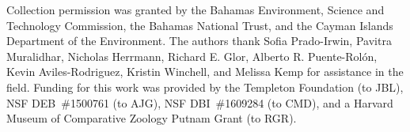 Collection permission was granted by the Bahamas Environment, Science and Technology Commission, the Bahamas National Trust, and the Cayman Islands Department of the Environment. The authors thank Sofia Prado-Irwin, Pavitra Muralidhar, Nicholas Herrmann, Richard E. Glor, Alberto R. Puente-Rol\'{o}n, Kevin Aviles-Rodriguez, Kristin Winchell, and Melissa Kemp for assistance in the field. Funding for this work was provided by the Templeton Foundation (to JBL), NSF DEB~\#1500761 (to AJG), NSF DBI~\#1609284 (to CMD), and a Harvard Museum of Comparative Zoology Putnam Grant (to RGR).